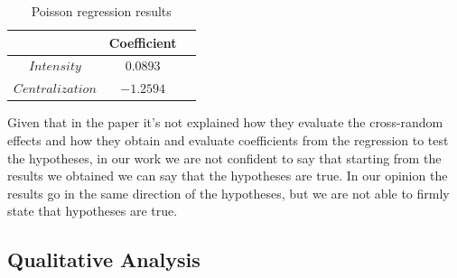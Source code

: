 \documentclass[12pt, a4paper]{article}
\begin{document}
\begin{table}[H]
    \centering
    \begin{tabular}{|c|c|c|}
            \hline
            & \textbf{Coefficient}  \\
            \hline
            $Intensity$  &  $0.0893$   \\
            \hline
            $Centralization$   &  $-1.2594$ \\
            \hline
    \end{tabular}
    \caption{Poisson regression results}
\end{table}
Given that in the \cite{GRUND} paper it's not explained how they evaluate the cross-random effects and how they obtain and evaluate coefficients from the regression to test the hypotheses, in our work we are not confident to say that starting from the results we obtained we can say that the hypotheses are true. In our opinion the results go in the same direction of the hypotheses, but we are not able to firmly state that hypotheses are true. \\
\subsection{Qualitative Analysis}
\label{qualitative-analysis}
\end{document}
